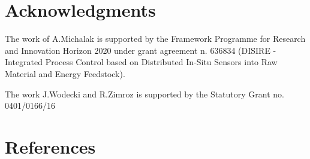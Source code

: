 \documentclass[preprint,12pt]{elsarticle}
\begin{document}
\section*{Acknowledgments}

The work of A.Michalak is supported by the Framework Programme for Research and Innovation Horizon 2020 under grant agreement n. 636834 (DISIRE - Integrated Process Control based on Distributed In-Situ Sensors into Raw Material and Energy Feedstock).

The work J.Wodecki and R.Zimroz is supported by the Statutory Grant no. 0401/0166/16

\section*{References}


\end{document}
